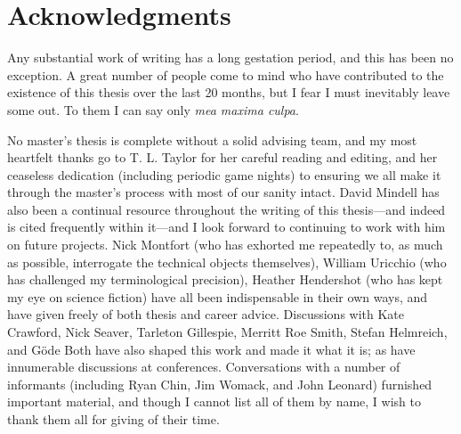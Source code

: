\cleardoublepage
\setcounter{savepage}{\thepage}
\begin{abstractpage}

\end{abstractpage}

% 

\cleardoublepage

\section*{Acknowledgments}

Any substantial work of writing has a long gestation period, and this
has been no exception. A great number of people come to mind who have
contributed to the existence of this thesis over the last 20 months,
but I fear I must 
inevitably leave some out. To them I can say only \emph{mea maxima culpa}. 

No master's thesis is complete without a
solid advising team, and my most heartfelt thanks go to T. L. Taylor
for her careful reading and editing, and her ceaseless dedication (including periodic
game nights) to ensuring we all make it through the master's process with most of our
sanity intact. David Mindell has also been a continual resource
throughout the writing of this thesis---and indeed is cited frequently
within it---and I look forward to continuing to work with him on
future projects. Nick Montfort (who has exhorted me repeatedly to, as
much as possible, interrogate the technical objects themselves),
William Uricchio (who has challenged my terminological precision),
Heather Hendershot (who has kept my eye on science fiction) have all
been indispensable in their own ways, and have given freely of both
thesis and career advice. Discussions with Kate Crawford, Nick Seaver,
Tarleton Gillespie, Merritt Roe Smith, Stefan Helmreich, and G\"{o}de Both have also
shaped this work and made it what it is; as have innumerable
discussions at conferences. Conversations with a number of informants
(including Ryan Chin, Jim Womack, and John Leonard)
furnished important material, and though I cannot list all of them by
name, I wish to thank them all for giving of their time.

